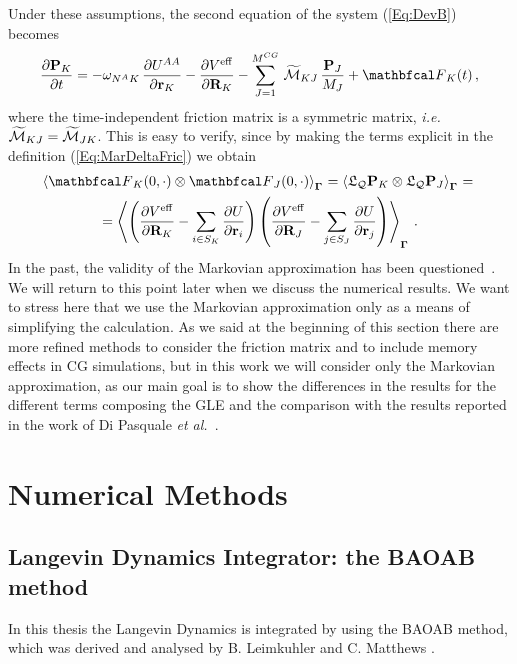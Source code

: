 \documentclass[10pt,a4paper]{book}
\theoremstyle{definition}
\begin{document}
\noindent
Under these assumptions, the second equation of the system (\ref{Eq:DevB}) becomes
\begin{equation}	
 \label{Eq:MarkovApprox}
  \pard{\bfP_{K}}{t} = -\omega_{\NA{}K} \, \pard{\pot^{AA}}{\bfr_{K}} 
                       -\pard{\Veff}{\bfR_{K}}
                       - \sum_{J=1}^{\ncg}\, \widetilde{\fricmat}_{KJ} \, \frac{\bfP_{J}}{M_{J}} 
                       + \fprojbf_{K}(t)\,,         
\end{equation}
where the time-independent friction matrix is a symmetric matrix, \textit{i.e.} $\widetilde{\mathcal{M}}_{KJ}=\widetilde{\mathcal{M}}_{JK}$. This is easy to verify, since by making the terms explicit in the definition (\ref{Eq:MarDeltaFric}) we obtain
\begin{multline}
\label{Eq:convFlucF}
  \aver{\fprojbf_K(0,\cdot) \otimes \fprojbf_J(0,\cdot)}_{\Bphase{}} = \aver{\Lio_\qproj\bfP_K \otimes \Lio_\qproj\bfP_J}_{\Bphase{}} ={}\\
  = \aver{ \cip{ \pard{\Veff}{\bfR_{K}} - \sum_{i\in S_K} \pard{U}{\bfr_{i}} } 
  \cip{ \pard{\Veff}{\bfR_{J}} - \sum_{j\in S_J} \pard{U}{\bfr_{j}} }}_{\Bphase{}}\,.
\end{multline}
In the past, the validity of the Markovian approximation has been questioned~\cite{CommentCubero,Cubero2005,Hijon2006,ResponseCommentHijon}. We will return to this point later when we discuss the numerical results. We want to stress here that we use the Markovian approximation only as a means of simplifying the calculation. As we said at the beginning of this section there are more refined methods to consider the friction matrix and to include memory effects in CG simulations, but in this work we will consider only the Markovian approximation, as our main goal is to show the differences in the results for the different terms composing the GLE and the comparison with the results reported in the work of Di Pasquale \textit{et al.}~\cite{DiPasquale2019}.


\chapter{Numerical Methods}
\label{Sec:NumMet}

\section{Langevin Dynamics Integrator: the BAOAB method}
In this thesis the Langevin Dynamics is integrated by using the BAOAB method, which was derived and analysed by B. Leimkuhler and C. Matthews \cite{LeimMatt:LAnDynInt}. 
\end{document}
